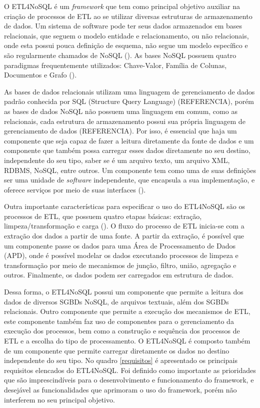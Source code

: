O ETL4NoSQL é um \textit{framework} que tem como principal objetivo auxiliar na criação de processos de ETL ao se utilizar diversas estruturas de armazenamento de dados. Um sistema de software pode ter seus dados armazenados em bases relacionais, que seguem o modelo entidade e relacionamento, ou não relacionais, onde esta possui pouca definição de esquema, não segue um modelo específico e são regularmente chamados de NoSQL (\cite{fowler:2013}). As bases NoSQL possuem quatro paradigmas frequentemente utilizados: Chave-Valor, Família de Colunas, Documentos e Grafo (\cite{fowler:2013}).

As bases de dados relacionais utilizam uma linguagem de gerenciamento de dados padrão conhecida por SQL (Structure Query Language) (REFERENCIA), porém as bases de dados NoSQL não possuem uma linguagem em comum, como as relacionais, cada estrutura de armazenamento possui sua própria linguagem de gerenciamento de dados (REFERENCIA). Por isso, é essencial que haja um componente que seja capaz de fazer a leitura diretamente da fonte de dados e um componente que também possa carregar esses dados diretamente no seu destino, independente do seu tipo, saber se é um arquivo texto,  um arquivo XML, RDBMS, NoSQL, entre outros. Um componente tem como uma de suas definições ser uma unidade de \textit{software} independente, que encapsula a sua implementação, e oferece serviços por meio de suas interfaces (\cite{itana:2005}).

Outra importante características para especificar o uso do ETL4NoSQL são os processos de ETL, que possuem quatro etapas básicas: extração, limpeza/transformação e carga (\cite{kimball:2004}). O fluxo do processo de ETL inicia-se com a extração dos dados a partir de uma fonte. A partir da extração, é possível que um componente passe os dados para uma Área de Processamento de Dados (APD), onde é possível modelar os dados executando processos de limpeza e transformação por meio de mecanismos de junção, filtro, união, agregação e outros. Finalmente, os dados podem ser carregados em estrutura de dados.

Dessa forma, o ETL4NoSQL possui um componente que permite a leitura dos dados de diversos SGBDs NoSQL, de arquivos textuais, além dos SGBDs relacionais. Outro componente que permite a execução dos mecanismos de ETL, este componente também faz uso de componentes para o gerenciamento da execução dos processos, bem como a construção e sequência dos processos de ETL e a escolha do tipo de processamento. O ETL4NoSQL é composto também de um componente que permite carregar diretamente os dados no destino independente do seu tipo. No quadro \ref{requisitos} é apresentado os principais requisitos elencados do ETL4NoSQL. Foi definido como importante as prioridades que são imprescindíveis para o desenvolvimento e funcionamento do framework, e desejável as funcionalidades que aprimoram o uso do framework, porém não interferem no seu principal objetivo.

